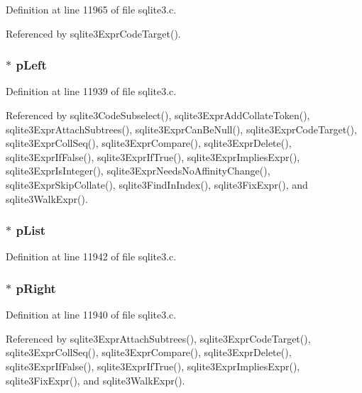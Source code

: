 Definition at line 11965 of file sqlite3.\+c.



Referenced by sqlite3\+Expr\+Code\+Target().

\hypertarget{struct_expr_a8494f5987915c2735faa11ebf6a2c878}{}
\subsubsection[{p\+Left}]{$\ast$ p\+Left}\label{struct_expr_a8494f5987915c2735faa11ebf6a2c878}


Definition at line 11939 of file sqlite3.\+c.



Referenced by sqlite3\+Code\+Subselect(), sqlite3\+Expr\+Add\+Collate\+Token(), sqlite3\+Expr\+Attach\+Subtrees(), sqlite3\+Expr\+Can\+Be\+Null(), sqlite3\+Expr\+Code\+Target(), sqlite3\+Expr\+Coll\+Seq(), sqlite3\+Expr\+Compare(), sqlite3\+Expr\+Delete(), sqlite3\+Expr\+If\+False(), sqlite3\+Expr\+If\+True(), sqlite3\+Expr\+Implies\+Expr(), sqlite3\+Expr\+Is\+Integer(), sqlite3\+Expr\+Needs\+No\+Affinity\+Change(), sqlite3\+Expr\+Skip\+Collate(), sqlite3\+Find\+In\+Index(), sqlite3\+Fix\+Expr(), and sqlite3\+Walk\+Expr().

\hypertarget{struct_expr_a16a988c1a5b1865fd1162b12c59beea0}{}
\subsubsection[{p\+List}]{$\ast$ p\+List}\label{struct_expr_a16a988c1a5b1865fd1162b12c59beea0}


Definition at line 11942 of file sqlite3.\+c.

\hypertarget{struct_expr_ad49d066af985113c5e9bc75df3810e84}{}
\subsubsection[{p\+Right}]{$\ast$ p\+Right}\label{struct_expr_ad49d066af985113c5e9bc75df3810e84}


Definition at line 11940 of file sqlite3.\+c.



Referenced by sqlite3\+Expr\+Attach\+Subtrees(), sqlite3\+Expr\+Code\+Target(), sqlite3\+Expr\+Coll\+Seq(), sqlite3\+Expr\+Compare(), sqlite3\+Expr\+Delete(), sqlite3\+Expr\+If\+False(), sqlite3\+Expr\+If\+True(), sqlite3\+Expr\+Implies\+Expr(), sqlite3\+Fix\+Expr(), and sqlite3\+Walk\+Expr().

